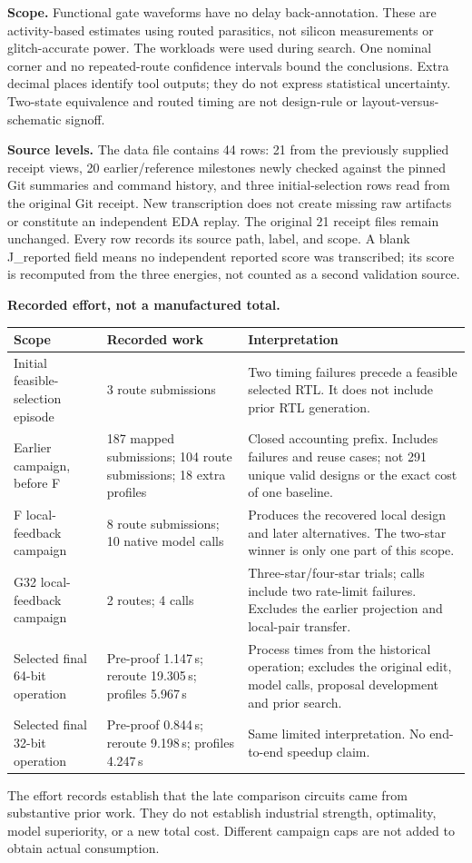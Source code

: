 \documentclass[10pt]{article}
\begin{document}
\textbf{Scope.} Functional gate waveforms have no delay back-annotation. These are activity-based estimates using routed parasitics, not silicon measurements or glitch-accurate power. The workloads were used during search. One nominal corner and no repeated-route confidence intervals bound the conclusions. Extra decimal places identify tool outputs; they do not express statistical uncertainty. Two-state equivalence and routed timing are not design-rule or layout-versus-schematic signoff.

\textbf{Source levels.} The data file contains 44 rows: 21 from the previously supplied receipt views, 20 earlier/reference milestones newly checked against the pinned Git summaries and command history, and three initial-selection rows read from the original Git receipt. New transcription does not create missing raw artifacts or constitute an independent EDA replay. The original 21 receipt files remain unchanged. Every row records its source path, label, and scope. A blank J\_reported field means no independent reported score was transcribed; its score is recomputed from the three energies, not counted as a second validation source.

\textbf{Recorded effort, not a manufactured total.}
\begin{center}\small\setlength{\tabcolsep}{5pt}
\begin{tabular}{@{}p{4.1cm}p{3.7cm}p{7.0cm}@{}}\toprule
Scope & Recorded work & Interpretation\\\midrule
Initial feasible-selection episode & 3 route submissions & Two timing failures precede a feasible selected RTL. It does not include prior RTL generation.\\
Earlier campaign, before F & 187 mapped submissions; 104 route submissions; 18 extra profiles & Closed accounting prefix. Includes failures and reuse cases; not 291 unique valid designs or the exact cost of one baseline.\\
F local-feedback campaign & 8 route submissions; 10 native model calls & Produces the recovered local design and later alternatives. The two-star winner is only one part of this scope.\\
G32 local-feedback campaign & 2 routes; 4 calls & Three-star/four-star trials; calls include two rate-limit failures. Excludes the earlier projection and local-pair transfer.\\
Selected final 64-bit operation & Pre-proof 1.147\,s; reroute 19.305\,s; profiles 5.967\,s & Process times from the historical operation; excludes the original edit, model calls, proposal development and prior search.\\
Selected final 32-bit operation & Pre-proof 0.844\,s; reroute 9.198\,s; profiles 4.247\,s & Same limited interpretation. No end-to-end speedup claim.\\\bottomrule
\end{tabular}\end{center}
The effort records establish that the late comparison circuits came from substantive prior work. They do not establish industrial strength, optimality, model superiority, or a new total cost. Different campaign caps are not added to obtain actual consumption.
\end{document}
